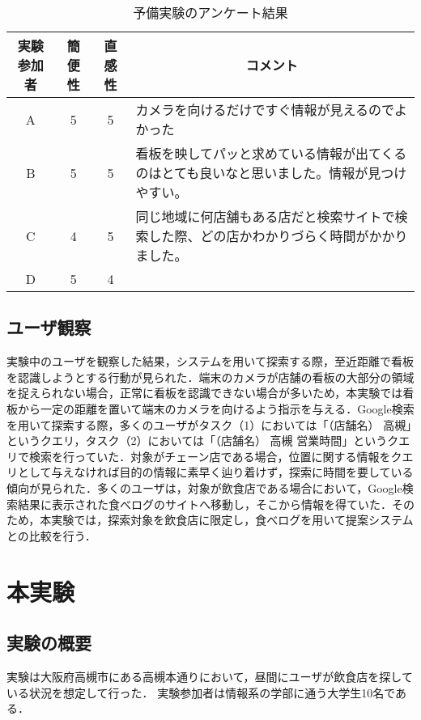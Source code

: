     \begin{table}
      \begin{center}
        \caption{予備実験のアンケート結果}
        \label{table:exp_sbs_pre_questionnaire}
        \begin{tabular}{c|ccp{9cm}}
          \hline \hline
          \textbf{実験参加者} & \textbf{簡便性} & \textbf{直感性} & \multicolumn{1}{c}{\textbf{コメント}} \\
          \hline
          A & 5 & 5 & カメラを向けるだけですぐ情報が見えるのでよかった \\
          B & 5 & 5 & 看板を映してパッと求めている情報が出てくるのはとても良いなと思いました。情報が見つけやすい。 \\
          C & 4 & 5 & 同じ地域に何店舗もある店だと検索サイトで検索した際、どの店かわかりづらく時間がかかりました。 \\
          D & 5 & 4 & \\
          \hline
        \end{tabular}
      \end{center}
    \end{table}

  \subsection{ユーザ観察}
    実験中のユーザを観察した結果，システムを用いて探索する際，至近距離で看板を認識しようとする行動が見られた．端末のカメラが店舗の看板の大部分の領域を捉えられない場合，正常に看板を認識できない場合が多いため，本実験では看板から一定の距離を置いて端末のカメラを向けるよう指示を与える．Google検索を用いて探索する際，多くのユーザがタスク（1）においては「（店舗名） 高槻」というクエリ，タスク（2）においては「（店舗名） 高槻 営業時間」というクエリで検索を行っていた．対象がチェーン店である場合，位置に関する情報をクエリとして与えなければ目的の情報に素早く辿り着けず，探索に時間を要している傾向が見られた．多くのユーザは，対象が飲食店である場合において，Google検索結果に表示された食べログのサイトへ移動し，そこから情報を得ていた．そのため，本実験では，探索対象を飲食店に限定し，食べログを用いて提案システムとの比較を行う．

\section{本実験}
  \subsection{実験の概要}
    実験は大阪府高槻市にある高槻本通りにおいて，昼間にユーザが飲食店を探している状況を想定して行った．
    実験参加者は情報系の学部に通う大学生10名である．

